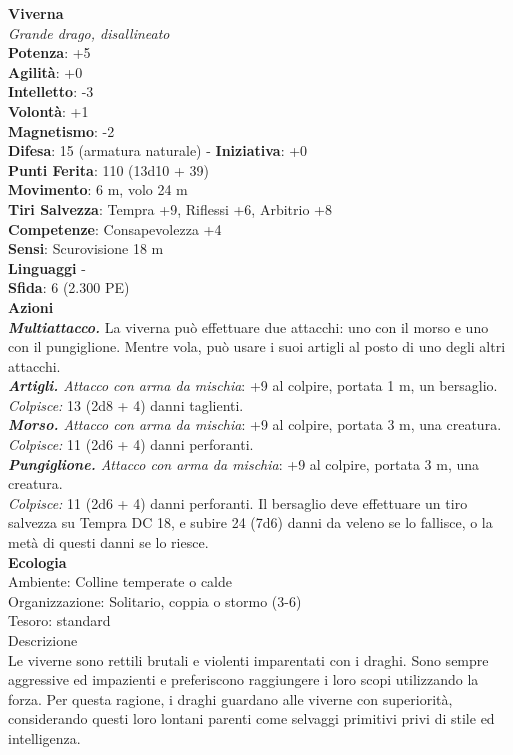 \begin{multicols}{2}
\medskip\textbf{Viverna}\\
\emph{Grande drago, disallineato}\\
\textbf{Potenza}: +5\\
\textbf{Agilità}: +0\\
\textbf{Intelletto}: -3\\
\textbf{Volontà}: +1\\
\textbf{Magnetismo}: -2\\
\textbf{Difesa}: 15 (armatura naturale) - \textbf{Iniziativa}: +0\\
\textbf{Punti Ferita}: 110 (13d10 + 39)\\
\textbf{Movimento}: 6 m, volo 24 m\\
\textbf{Tiri Salvezza}: Tempra +9, Riflessi +6, Arbitrio +8\\
\textbf{Competenze}: Consapevolezza +4\\
\textbf{Sensi}: Scurovisione 18 m\\
\textbf{Linguaggi} -\\
\textbf{Sfida}: 6 (2.300 PE)\smallskip\\
\smallskip\textbf{Azioni}\\
\emph{\textbf{Multiattacco.}} La viverna può effettuare due attacchi: uno con il morso e uno con il pungiglione. Mentre vola, può usare i suoi artigli al posto di uno degli altri attacchi.\\
\emph{\textbf{Artigli.} Attacco con arma da mischia}: +9 al colpire, portata 1 m, un bersaglio.\\
\emph{Colpisce:} 13 (2d8 + 4) danni taglienti.\\
\emph{\textbf{Morso.} Attacco con arma da mischia}: +9 al colpire, portata 3 m, una creatura.\\
\emph{Colpisce:} 11 (2d6 + 4) danni perforanti.\\
\emph{\textbf{Pungiglione.} Attacco con arma da mischia}: +9 al colpire, portata 3 m, una creatura.\\
\emph{Colpisce:} 11 (2d6 + 4) danni perforanti. Il bersaglio deve effettuare un tiro salvezza su Tempra DC  18, e subire 24 (7d6) danni da veleno se lo fallisce, o la metà di questi danni se lo riesce.\\
\textbf{Ecologia}\\
Ambiente: Colline temperate o calde\\
Organizzazione: Solitario, coppia o stormo (3-6)\\
Tesoro: standard\\
Descrizione\\
Le viverne sono rettili brutali e violenti imparentati con i draghi. Sono sempre aggressive ed impazienti e preferiscono raggiungere i loro scopi utilizzando la forza. Per questa ragione, i draghi guardano alle viverne con superiorità, considerando questi loro lontani parenti come selvaggi primitivi privi di stile ed intelligenza.\\


\end{multicols}
